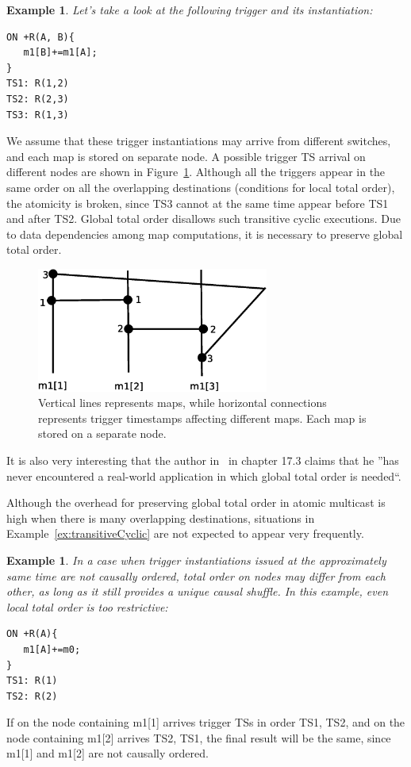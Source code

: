 \documentclass{sig-semester}
\newtheorem{example}[theorem]{Example}
\begin{document}
\begin{example} \em
\label{ex:transitiveCyclic}
Let's take a look at the following trigger and its instantiation:
\begin{verbatim}
ON +R(A, B){
   m1[B]+=m1[A];
}
TS1: R(1,2)
TS2: R(2,3)
TS3: R(1,3)
\end{verbatim}
\end{example}
We assume that these trigger instantiations may arrive from different switches, and each map is stored on separate node. A possible trigger TS arrival on different nodes are shown in Figure~\ref{fig:transitiveCyclic}. Although all the triggers appear in the same order on all the overlapping destinations (conditions for local total order), the atomicity is broken, since TS3 cannot at the same time appear before TS1 and after TS2. Global total order disallows such transitive cyclic executions. Due to data dependencies among map computations, it is necessary to preserve global total order.
\begin{figure}[!t]
\centering
\includegraphics[width=3in]{transitiveCyclic.eps}
\vspace{-3mm}
\caption{Vertical lines represents maps, while horizontal connections represents trigger timestamps affecting different maps. Each map is stored on a separate node.}
\label{fig:transitiveCyclic}
\vspace{-2mm}
\end{figure}

It is also very interesting that the author in~\cite{Birman06} in chapter 17.3 claims that he ''has never encountered a real-world application in which global total order is needed``.

Although the overhead for preserving global total order in atomic multicast is high when there is many overlapping destinations, situations in Example~\ref{ex:transitiveCyclic} are not expected to appear very frequently. 

\begin{example} \em
\label{ex:allowedCyclic}
In a case when trigger instantiations issued at the approximately same time are not causally ordered, total order on nodes may differ from each other, as long as it still provides a unique causal shuffle. In this example, even local total order is too restrictive:
\begin{verbatim}
ON +R(A){
   m1[A]+=m0;
}
TS1: R(1)
TS2: R(2)
\end{verbatim}
\end{example}
If on the node containing m1[1] arrives trigger TSs in order TS1, TS2, and on the node containing m1[2] arrives TS2, TS1, the final result will be the same, since m1[1] and m1[2] are not causally ordered.
\end{document}
